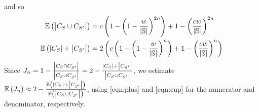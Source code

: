 and so
\begin{align}
  {\ensuremath{\mathbb{E}\left({\left|{C_{S_{}}\cup C_{S_{}'}}\right|}\right)}}
  &= c
     \left(1-\left(1-\frac{w}{\left|{\mathbb{S}}\right|}\right)^{2n}\right)
   +1-\left(\frac{cw}{\left|{\mathbb{S}}\right|}\right)^{2n} \label{eqn:cup} \\
   {\mathbb{E}\left({\left|{C_{S_{}}}\right|+\left|{C_{S_{}'}}\right|}\right)}
   &= 2\left(c
       \left(1-\left(1-\frac{w}{\left|{\mathbb{S}}\right|}\right)^{n}\right) + 1 - \left(\frac{cw}{\left|{\mathbb{S}}\right|}\right)^{n}\right) \label{eqn:plus}
 \end{align}
 Since $J_{n} = 1-\frac{\left|{C_{S_{}}\cap C_{S_{}'}}\right|}{\left|{C_{S_{}}\cup C_{S_{}'}}\right|}
 = 2-\frac{\left|{C_{S_{}}}\right|+\left|{C_{S_{}'}}\right|}{\left|{C_{S_{}}\cup C_{S_{}'}}\right|}$, we estimate $\mathbb{E}\left({J_{n}}\right) \approx 2 - \frac{\mathbb{E}\left({\left|{C_{S_{}}}\right|+\left|{C_{S_{}'}}\right|}\right)}{\mathbb{E}\left({\left|{C_{S_{}}\cup C_{S_{}'}}\right|}\right)}$,
 using \eqref{eqn:plus} and \eqref{eqn:cup} for the numerator and denominator,
 respectively.
